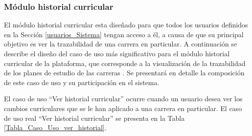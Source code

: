 	\subsubsection{Módulo historial curricular}
	
	El módulo historial curricular esta diseñado para que todos los usuarios definidos en la Sección \ref{usuarios_Sistema} tengan acceso a él, a causa de que su principal objetivo es ver la trazabilidad de una carrera en particular.
	A continuación se describe el diseño del caso de uso más significativo para el módulo  historial curricular de la plataforma, que corresponde a la visualización de la trazabilidad de los planes de estudio de las carreras . Se presentará en detalle la composición de este caso de uso y su participación en el sistema.
		
	
	El caso de uso “Ver historial curricular” ocurre cuando un usuario  desea  ver los cambios  curriculares que se le han aplicado a una carrera en particular. El caso de uso real “Ver historial curricular” se presenta en la Tabla \ref{Tabla_Caso_Uso_ver_historial}.
	
